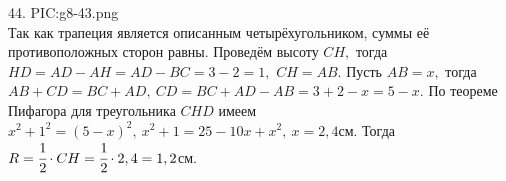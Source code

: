 44. {{PIC:g8-43.png}}\\
Так как трапеция является описанным четырёхугольником, суммы её противоположных сторон равны. Проведём высоту $CH,$ тогда $HD=AD-AH=AD-BC=3-2=1,$ $CH=AB.$ Пусть $AB=x,$ тогда $AB+CD=BC+AD,\ CD=BC+AD-AB=3+2-x=5-x.$ По теореме Пифагора для треугольника $CHD$ имеем $x^2+1^2=(5-x)^2,\ x^2+1=25-10x+x^2,\ x=2,4$см. Тогда $R=\cfrac{1}{2}\cdot CH=\cfrac{1}{2}\cdot 2,4=1,2$см.\\
